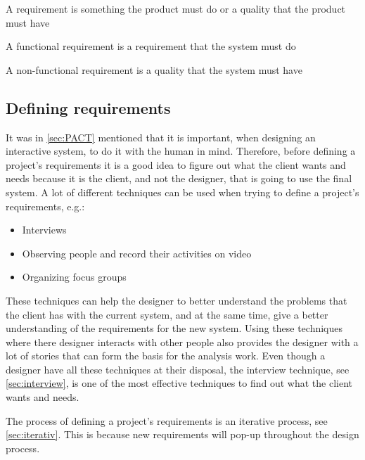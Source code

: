 \begin{defn}
    A requirement is something the product must do or a quality that the product must have
\end{defn}

\begin{defn}
    A functional requirement is a requirement that the system must do
\end{defn}

\begin{defn}
    A non-functional requirement is a quality that the system must have
\end{defn}

\subsection{Defining requirements} \label{sec:requirementsdefinition}
It was in \cref{sec:PACT} mentioned that it is important, when designing an interactive system, to do it with the human in mind.
Therefore, before defining a project's requirements it is a good idea to figure out what the client wants and needs because it is the client, and not the designer, that is going to use the final system.
A lot of different techniques can be used when trying to define a project's requirements, e.g.:

\begin{itemize}
    \item Interviews
    \item Observing people and record their activities on video
    \item Organizing focus groups
\end{itemize}

These techniques can help the designer to better understand the problems that the client has with the current system, and at the same time, give a better understanding of the requirements for the new system.
Using these techniques where there designer interacts with other people also provides the designer with a lot of stories that can form the basis for the analysis work. Even though a designer have all these techniques at their disposal, the interview technique, see \cref{sec:interview}, is one of the most effective techniques to find out what the client wants and needs.

The process of defining a project's requirements is an iterative process, see \cref{sec:iterativ}. This is because new requirements will pop-up throughout the design process.

